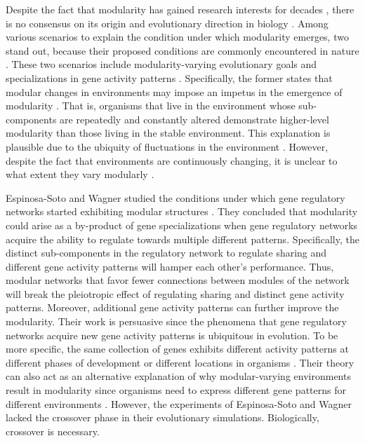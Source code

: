 Despite the fact that modularity has gained research interests for decades \cite{wagner2007road}, there is no consensus on its origin and evolutionary direction in biology \cite{wagner2004role}. Among various scenarios to explain the condition under which modularity emerges, two stand out, because their proposed conditions are commonly encountered in nature \cite{wagner2007road}. These two scenarios include modularity-varying evolutionary goals \cite{kashtan2005spontaneous} and specializations in gene activity patterns \cite{espinosa2010specialization}. Specifically, the former states that modular changes in environments may impose an impetus in the emergence of modularity \cite{kashtan2005spontaneous}. That is, organisms that live in the environment whose sub-components are repeatedly and constantly altered demonstrate higher-level modularity than those living in the stable environment. This explanation is plausible due to the ubiquity of fluctuations in the environment \cite{espinosa2010specialization}. However, despite the fact that environments are continuously changing, it is unclear to what extent they vary modularly  \cite{espinosa2010specialization}. 

Espinosa-Soto and Wagner studied the conditions under which gene regulatory networks started exhibiting modular structures \cite{espinosa2010specialization}. They concluded that modularity could arise as a by-product of gene specializations when gene regulatory networks acquire the ability to regulate towards multiple different patterns. Specifically, the distinct sub-components in the regulatory network to regulate sharing and different gene activity patterns will hamper each other's performance. Thus, modular networks that favor fewer connections between modules of the network will break the pleiotropic effect of regulating sharing and distinct gene activity patterns. Moreover, additional gene activity patterns can further improve the modularity. Their work is persuasive since the phenomena that gene regulatory networks acquire new gene activity patterns is ubiquitous in evolution. To be more specific, the same collection of genes exhibits different activity patterns at different phases of development or different locations in organisms \cite{espinosa2010specialization}. Their theory can also act as an alternative explanation of why modular-varying environments result in modularity since organisms need to express different gene patterns for different environments \cite{kashtan2005spontaneous} \cite{espinosa2010specialization}. However, the experiments of Espinosa-Soto and Wagner lacked the crossover phase in their evolutionary simulations. Biologically, crossover is necessary.

